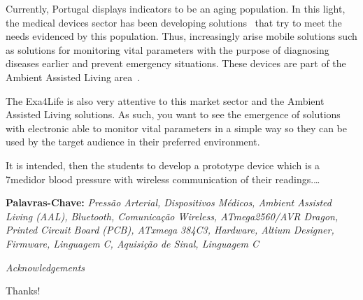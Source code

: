 \documentclass[11pt, oneside]{Thesis} %
\begin{document}
Currently, Portugal displays indicators to be an aging population. In this light, the medical devices sector has been developing solutions~\cite{joao} that try to meet the needs evidenced by this population. Thus, increasingly arise mobile solutions such as solutions for monitoring vital parameters with the purpose of diagnosing diseases earlier and prevent emergency situations. These devices are part of the Ambient Assisted Living area~\cite{jose}.

The Exa4Life is also very attentive to this market sector and the Ambient Assisted Living solutions. As such, you want to see the emergence of solutions with electronic able to monitor vital parameters in a simple way so they can be used by the target audience in their preferred environment.

It is intended, then the students to develop a prototype device which is a 7medidor blood pressure with wireless communication of their readings.\ldots

\null
\vfill


\textbf{Palavras-Chave:} \textit{Pressão Arterial, Dispositivos Médicos, Ambient Assisted
Living (AAL), Bluetooth, Comunicação Wireless, ATmega2560/AVR Dragon, Printed Circuit Board (PCB), ATxmega 384C3, Hardware, Altium
Designer, Firmware, Linguagem C, Aquisição de Sinal, Linguagem C}

\clearpage %

\thispagestyle{plain}


\begin{center}
 {\huge{\textit{Acknowledgements}} \par}
  \bigskip
\end{center}

Thanks!

\clearpage %


\pagestyle{fancy} %
\end{document}
